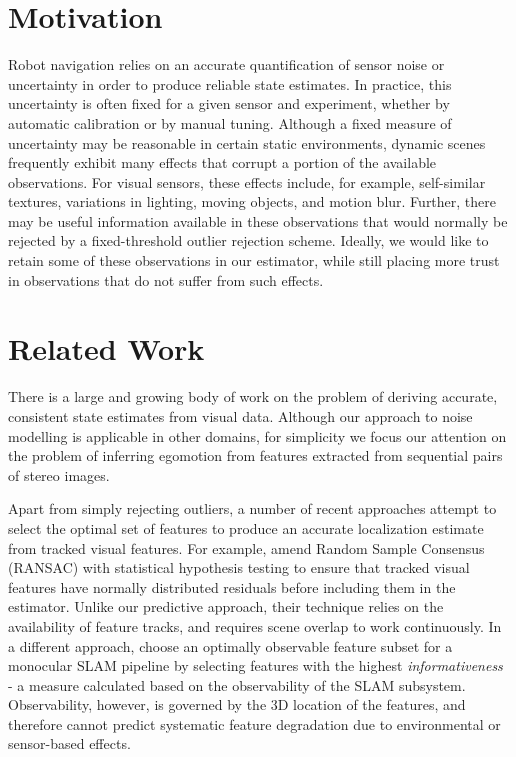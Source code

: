 \section{Motivation}

Robot navigation relies on an accurate quantification of sensor noise or uncertainty in order to produce reliable state estimates.
In practice, this uncertainty is often fixed for a given sensor and experiment, whether by automatic calibration or by manual tuning.
Although a fixed measure of uncertainty may be reasonable in certain static environments, dynamic scenes frequently exhibit many effects that corrupt a portion of the available observations.
For visual sensors, these effects include, for example, self-similar textures, variations in lighting, moving objects, and motion blur. 
Further, there may be useful information available in these observations that would normally be rejected by a fixed-threshold outlier rejection scheme. 
Ideally, we would like to retain some of these observations in our estimator, while still placing more trust in observations that do not suffer from such effects.


\section{Related Work}


There is a large and growing body of work on the problem of deriving accurate,
consistent state estimates from visual data.  Although our approach to noise
modelling is applicable in other domains, for simplicity we focus our attention
on the problem of inferring egomotion from features extracted from sequential
pairs of stereo images. 

Apart from simply rejecting outliers, a number of recent approaches attempt to
select the optimal set of features to produce an accurate localization estimate
from tracked visual features. For example, \citet{Tsotsos2015} amend Random
Sample Consensus (RANSAC) with statistical hypothesis testing to ensure that tracked visual features have normally distributed residuals before including them in
the estimator. Unlike our predictive approach, their technique relies on the availability of feature tracks, and requires scene overlap to work continuously. In a different
approach,  choose an optimally observable feature subset for a
monocular SLAM pipeline by selecting features with the highest \textit{informativeness} - a measure calculated based on the observability of the SLAM subsystem. Observability, however, is governed by the 3D location of the features, and therefore cannot predict systematic feature degradation due to environmental or sensor-based effects. 


